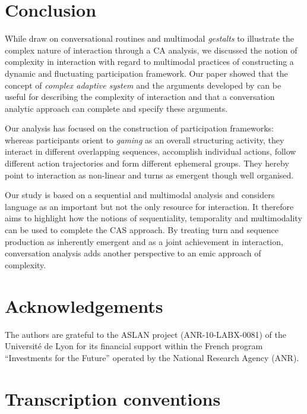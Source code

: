 \documentclass[output=paper]{langscibook}
\begin{document}
\section{Conclusion}\label{sec:13:5}
\begin{sloppypar}
While  draw on conversational routines and multimodal \textit{gestalts} to illustrate the complex nature of interaction through a CA analysis, we discussed the notion of complexity in interaction with regard to multimodal practices of constructing a dynamic and fluctuating participation framework. Our paper showed that the concept of \textit{complex adaptive system} and the arguments developed by \citet{BecknerEtAl2009} can be useful for describing the complexity of interaction and that a conversation analytic approach can complete and specify these arguments.
\end{sloppypar}

Our analysis has focused on the construction of participation frameworks: whereas participants orient to \textit{gaming} as an overall structuring activity, they interact in different overlapping sequences, accomplish individual actions, follow different action trajectories and form different ephemeral groups. They hereby point to interaction as non-linear and turns as emergent though well organised.

Our study is based on a sequential and multimodal analysis and considers language as an important but not the only resource for interaction. It therefore aims to highlight how the notions of sequentiality, temporality and multimodality can be used to complete the CAS approach. By treating turn and sequence production as inherently emergent and as a joint achievement in interaction, conversation analysis adds another perspective to an emic approach of complexity. 

\section*{Acknowledgements}
The authors are grateful to the ASLAN project (ANR-10-LABX-0081) of the Université de Lyon for its financial support within the French program “Investments for the Future” operated by the National Research Agency (ANR).

\section*{Transcription conventions}
\end{document}
